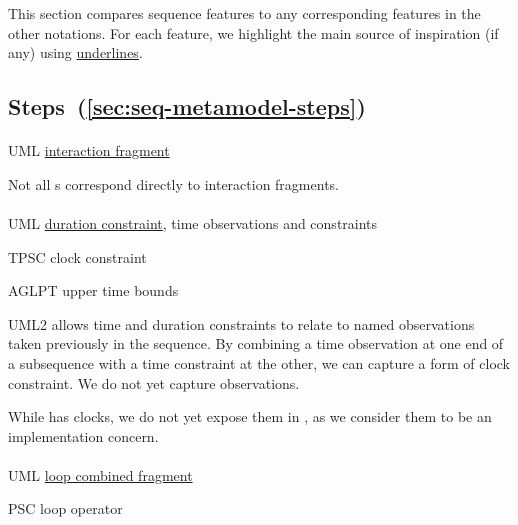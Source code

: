 \newcommand{\insp}[1]{\ul{#1}}

This section compares \langname{} sequence features to any
corresponding features in the other notations.
For each feature, we highlight the main source of inspiration (if any)
using \insp{underlines}.


\subsection{Steps~(\ref{sec:seq-metamodel-steps})}

\paragraph{\msequencestep}
\begin{featset}
\item[UML] \insp{interaction fragment}
\end{featset}

Not all \msequencestep s correspond directly to interaction fragments.

\paragraph{\mdeadlinestep}
\begin{featset}
\item[UML] \insp{duration constraint}, time observations and constraints
\item[TPSC] clock constraint
\item[AGLPT] upper time bounds
\end{featset}

UML2 allows time and duration constraints to relate to named observations taken
previously in the sequence.  By combining a time observation at one end of a
subsequence with a time constraint at the other, we can capture a form of clock
constraint.  We do not yet capture observations.

While \robochart{} has clocks, we do not yet expose them in
\langname, as we consider them to be an implementation concern.

\paragraph{\mloopstep}
\begin{featset}
\item[UML] \insp{loop combined fragment}
\item[PSC] loop operator
\end{featset}

